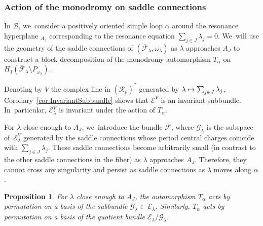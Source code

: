 \documentclass[11pt]{article}
\newcommand\mto{\mathchoice{\longmapsto}{\mapsto}{\mapsto}{\mapsto}}
\newtheorem{prop}[thm]{Proposition}
\theoremstyle{definition}
\begin{document}
\subsubsection{Action of the monodromy on saddle connections}

In $\mathcal{B}$, we~consider a positively oriented simple loop $\alpha$ around the resonance hyperplane $_{A_{J}}$ corresponding to the resonance equation $\sum_{j \in J} \lambda_{j} =0$. We~will use the geometry of the saddle connections of $(\overline{\mathcal{F}}_{\lambda},\omega_{\lambda})$ as $\lambda$ approaches $A_{J}$ to construct a block decomposition of the monodromy automorphism $T_{\alpha}$ on $H_{1}(\overline{\mathcal{F}}_{\lambda} \setminus P_{\omega_{\lambda}})$.

Denoting by $V$ the complex line in $(\mathcal{R}_{p})^{\ast}$ generated by $\lambda \mto \sum_{j \in J} \lambda_{j}$, Corollary~\ref{cor:InvariantSubbundle} shows that $\mathcal{E}^{V}$ is an invariant subbundle. In~particular, $\mathcal{E}_{\lambda}^{V}$ is invariant under the action of $T_{\alpha}$.

For $\lambda$ close enough to $A_{J}$, we~introduce the bundle $\mathcal{F}$, where $\mathcal{G}_{\lambda}$ is the subspace of~$\mathcal{E}_{\lambda}^{V}$ generated by the saddle connections whose period central charges coincide with $\sum_{j \in J} \lambda_{j}$. These saddle connections become arbitrarily small (in contrast to the other saddle connections in the fiber) as $\lambda$ approaches $A_{J}$. Therefore, they cannot cross any singularity and persist as saddle connections as $\lambda$ moves along $\alpha$.

\begin{prop}\label{prop:MonoSC}
For $\lambda$ close enough to $A_{J}$, the automorphism $T_{\alpha}$ acts by permutation on a basis of the subbundle $\mathcal{G}_{\lambda} \subset \mathcal{E}_{\lambda}$. Similarly, $T_{\alpha}$ acts by permutation on a basis of the quotient bundle $\mathcal{E}_{\lambda}/\mathcal{G}_{\lambda}$.
\end{prop}
\end{document}
